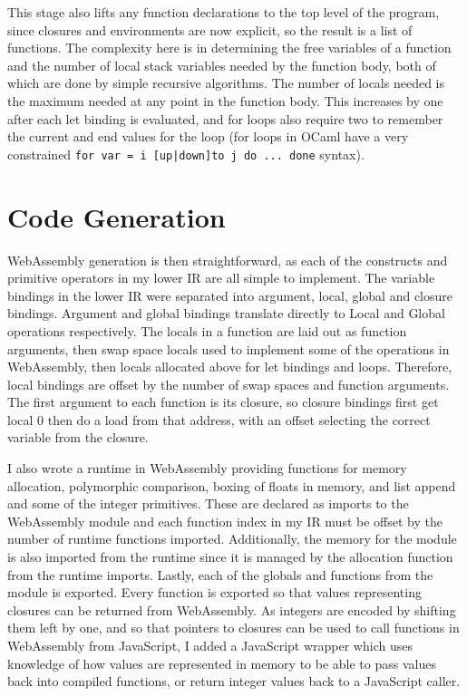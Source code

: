 This stage also lifts any function declarations to the top level of the program, since closures and environments are now explicit, so the result is a list of functions. The complexity here is in determining the free variables of a function and the number of local stack variables needed by the function body, both of which are done by simple recursive algorithms. The number of locals needed is the maximum needed at any point in the function body. This increases by one after each let binding is evaluated, and for loops also require two to remember the current and end values for the loop (for loops in OCaml have a very constrained \verb"for var = i [up|down]to j do ... done" syntax). 


\section{Code Generation}
WebAssembly generation is then straightforward, as each of the constructs and primitive operators in my lower IR are all simple to implement. The variable bindings in the lower IR were separated into argument, local, global and closure bindings. Argument and global bindings translate directly to Local and Global operations respectively. The locals in a function are laid out as function arguments, then swap space locals used to implement some of the operations in WebAssembly, then locals allocated above for let bindings and loops. Therefore, local bindings are offset by the number of swap spaces and function arguments. The first argument to each function is its closure, so closure bindings first get local 0 then do a load from that address, with an offset selecting the correct variable from the closure. 

I also wrote a runtime in WebAssembly providing functions for memory allocation, polymorphic comparison, boxing of floats in memory, and list append and some of the integer primitives. These are declared as imports to the WebAssembly module and each function index in my IR must be offset by the number of runtime functions imported. Additionally, the memory for the module is also imported from the runtime since it is managed by the allocation function from the runtime imports. Lastly, each of the globals and functions from the module is exported. Every function is exported so that values representing closures can be returned from WebAssembly. As integers are encoded by shifting them left by one, and so that pointers to closures can be used to call functions in WebAssembly from JavaScript, I added a JavaScript wrapper which uses knowledge of how values are represented in memory to be able to pass values back into compiled functions, or return integer values back to a JavaScript caller.

